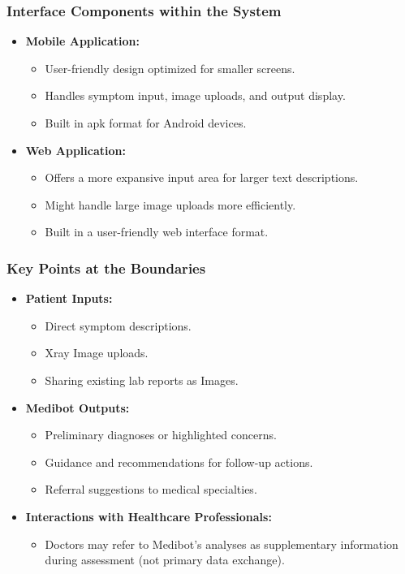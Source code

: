 \subsubsection{Interface Components within the System}

\begin{itemize}
    \item \textbf{Mobile Application:}
        \begin{itemize}
            \item User-friendly design optimized for smaller screens.
            \item Handles symptom input, image uploads, and output display.
            \item Built in apk format for Android devices.
        \end{itemize}

    \item \textbf{Web Application:}
        \begin{itemize}
            \item Offers a more expansive input area for larger text descriptions.
            \item Might handle large image uploads more efficiently.
            \item Built in a user-friendly web interface format.
        \end{itemize}
\end{itemize}

\subsubsection{Key Points at the Boundaries}

\begin{itemize}
    \item \textbf{Patient Inputs:}
        \begin{itemize}
            \item Direct symptom descriptions.
            \item Xray Image uploads.
            \item Sharing existing lab reports as Images.
        \end{itemize}

    \item \textbf{Medibot Outputs:}
        \begin{itemize}
            \item Preliminary diagnoses or highlighted concerns.
            \item Guidance and recommendations for follow-up actions.
            \item Referral suggestions to medical specialties.
        \end{itemize}

    \item \textbf{Interactions with Healthcare Professionals:} 
        \begin{itemize}
            \item Doctors may refer to Medibot's analyses as supplementary information during assessment (not primary data exchange).
        \end{itemize}
\end{itemize}


